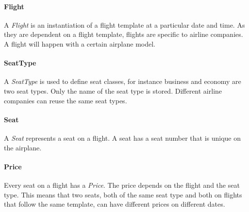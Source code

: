 \documentclass[a4paper]{article}
\newcommand{\field}[1]{\emph{#1}}
\begin{document}


\paragraph{Flight}
A \field{Flight} is an instantiation of a flight template at a particular date and time.
As they are dependent on a flight template, flights are specific to airline companies.
A flight will happen with a certain airplane model.
\paragraph{SeatType}
A \field{SeatType} is used to define seat classes, for instance business and economy are two seat types.
Only the name of the seat type is stored.
Different airline companies can reuse the same seat types.
\paragraph{Seat}
A \field{Seat} represents a seat on a flight.
A seat has a seat number that is unique on the airplane.
\paragraph{Price}
Every seat on a flight has a \field{Price}.
The price depends on the flight and the seat type.
This means that two seats, both of the same seat type and both on flights that follow the same template, can have different prices on different dates.
\end{document}
